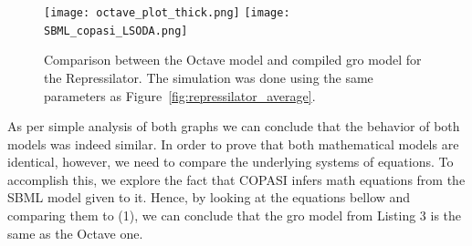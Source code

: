 \documentclass[12pt]{article}
\begin{document}
    \begin{figure}[ht]
    \centering
      \texttt{[image: octave\_plot\_thick.png]}
    \endminipage\hfill
      \texttt{[image: SBML\_copasi\_LSODA.png]}
    \endminipage\hfill
    \label{fig:repressilator_comparison}
    \caption{Comparison between the Octave model and compiled gro model for the Repressilator. The simulation was done using the same parameters as Figure~\ref{fig:repressilator_average}.}
    \end{figure}
    
    As per simple analysis of both graphs we can conclude that the behavior of both models was indeed similar. In order to prove that both mathematical models are identical, however, we need to compare the underlying systems of equations. To accomplish this, we explore the fact that COPASI infers math equations from the SBML model given to it. Hence, by looking at the equations bellow and comparing them to (1), we can conclude that the gro model from Listing 3 is the same as the Octave one.
    
\end{document}
